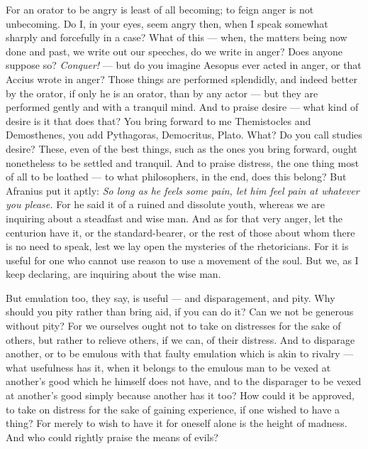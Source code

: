 For an orator to be angry is least of all becoming; to feign anger is not unbecoming. Do I, in your eyes, seem angry then, when I speak somewhat sharply and forcefully in a case? What of this — when, the matters being now done and past, we write out our speeches, do we write in anger? Does anyone suppose so? \textit{Conquer!} — but do you imagine Aesopus ever acted in anger, or that Accius wrote in anger? Those things are performed splendidly, and indeed better by the orator, if only he is an orator, than by any actor — but they are performed gently and with a tranquil mind. And to praise desire — what kind of desire is it that does that? You bring forward to me Themistocles and Demosthenes, you add Pythagoras, Democritus, Plato. What? Do you call studies desire? These, even of the best things, such as the ones you bring forward, ought nonetheless to be settled and tranquil. And to praise distress, the one thing most of all to be loathed — to what philosophers, in the end, does this belong? But Afranius put it aptly: \textit{So long as he feels some pain, let him feel pain at whatever you please.} For he said it of a ruined and dissolute youth, whereas we are inquiring about a steadfast and wise man. And as for that very anger, let the centurion have it, or the standard-bearer, or the rest of those about whom there is no need to speak, lest we lay open the mysteries of the rhetoricians. For it is useful for one who cannot use reason to use a movement of the soul. But we, as I keep declaring, are inquiring about the wise man.

 But emulation too, they say, is useful — and disparagement, and pity. Why should you pity rather than bring aid, if you can do it? Can we not be generous without pity? For we ourselves ought not to take on distresses for the sake of others, but rather to relieve others, if we can, of their distress. And to disparage another, or to be emulous with that faulty emulation which is akin to rivalry — what usefulness has it, when it belongs to the emulous man to be vexed at another's good which he himself does not have, and to the disparager to be vexed at another's good simply because another has it too? How could it be approved, to take on distress for the sake of gaining experience, if one wished to have a thing? For merely to wish to have it for oneself alone is the height of madness. And who could rightly praise the means of evils?

